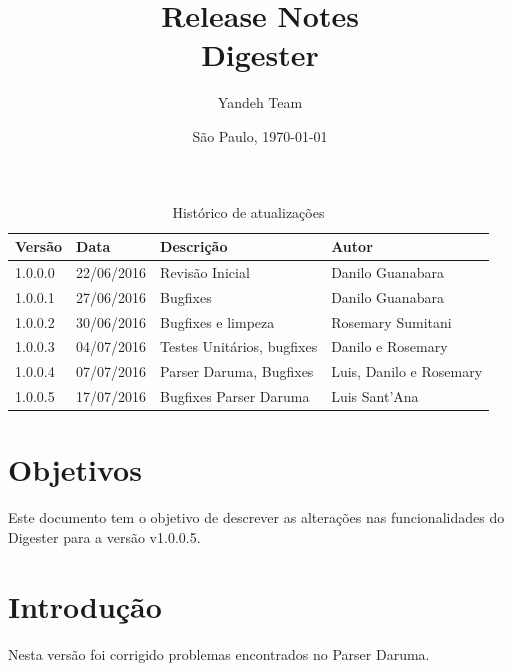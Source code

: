 \documentclass{article}      %
\title{Release Notes \\
      Digester \versiondigester}  %
\author{Yandeh Team}              %
\date{São Paulo, \today}
\newcommand{\versiondigester}{v1.0.0.5}
\begin{document}

\maketitle                   %

\thispagestyle{firststyle}


\begin{table}[!ht]
\centering
\caption{Histórico de atualizações}
\label{my-label}
\begin{tabular}{|l|l|l|l|}
\hline
\textbf{Versão} & \textbf{Data} & \textbf{Descrição}                & \textbf{Autor}                                       \\ \hline
1.0.0.0           & 22/06/2016    & Revisão Inicial                 & Danilo Guanabara                                     \\ \hline
1.0.0.1           & 27/06/2016    & Bugfixes                        & Danilo Guanabara                                     \\ \hline
1.0.0.2           & 30/06/2016    & Bugfixes e limpeza              & Rosemary Sumitani                                    \\ \hline
1.0.0.3           & 04/07/2016    & Testes Unitários, bugfixes      & Danilo e Rosemary                                    \\ \hline
1.0.0.4           & 07/07/2016    & Parser Daruma, Bugfixes         & Luis, Danilo e Rosemary                              \\ \hline
1.0.0.5           & 17/07/2016    & Bugfixes Parser Daruma           & Luis Sant'Ana                                        \\ \hline
\end{tabular}
\end{table}



\section{Objetivos}

Este documento tem o objetivo de descrever as alterações nas funcionalidades do Digester para a versão \versiondigester. 


\section{Introdução}     
Nesta versão foi corrigido problemas encontrados no Parser Daruma. 
\end{document}
